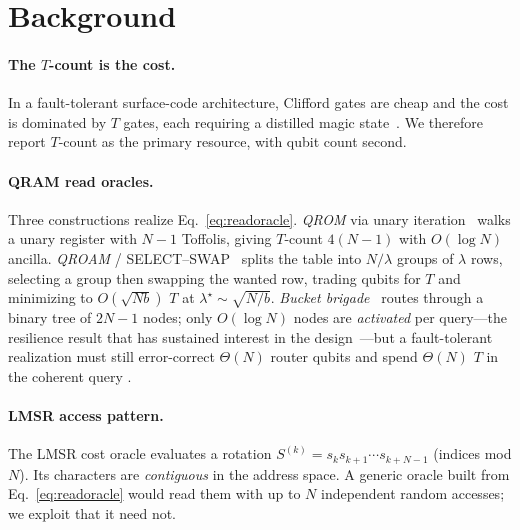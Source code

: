 \documentclass[11pt]{article}
\theoremstyle{definition}
\begin{document}
\section{Background}
\label{sec:background}
\paragraph{The $T$-count is the cost.} In a fault-tolerant surface-code
architecture, Clifford gates are cheap and the cost is dominated by $T$ gates,
each requiring a distilled magic state~\cite{babbush2018encoding}. We therefore
report $T$-count as the primary resource, with qubit count second.

\paragraph{QRAM read oracles.} Three constructions realize
Eq.~\eqref{eq:readoracle}. \emph{QROM} via unary
iteration~\cite{babbush2018encoding} walks a unary register with $N-1$ Toffolis,
giving $T$-count $4(N-1)$ with $O(\log N)$ ancilla. \emph{QROAM} /
SELECT--SWAP~\cite{low2024trading,berry2019qubitization} splits the table into
$N/\lambda$ groups of $\lambda$ rows, selecting a group then swapping the wanted
row, trading qubits for $T$ and minimizing to $O(\sqrt{Nb})$ $T$ at
$\lambda^\star\!\sim\!\sqrt{N/b}$. \emph{Bucket brigade}~%
\cite{giovannetti2008architectures} routes through a binary tree of $2N-1$ nodes;
only $O(\log N)$ nodes are \emph{activated} per query---the resilience result that
has sustained interest in the design~\cite{arunachalam2015robustness,
hann2021resilience}---but a fault-tolerant realization must still error-correct
$\Theta(N)$ router qubits and spend $\Theta(N)$ $T$ in the coherent query
\cite{dimatteo2020faulttolerant}.

\paragraph{LMSR access pattern.} The LMSR cost oracle evaluates a rotation
$S^{(k)}=s_k s_{k+1}\cdots s_{k+N-1}$ (indices mod $N$). Its characters are
\emph{contiguous} in the address space. A generic oracle built from
Eq.~\eqref{eq:readoracle} would read them with up to $N$ independent random
accesses; we exploit that it need not.
\end{document}
